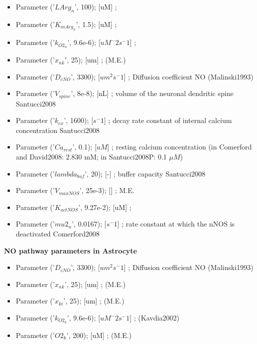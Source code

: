 \documentclass[fleqn]{report}
\numberwithin{equation}{section}
\numberwithin{equation}{section}
\begin{document}
\begin{itemize}
    \item Parameter  ('$LArg_n$', 100);          [uM] ; \\
    \item Parameter  ('$K_{mArg_{n}}$', 1.5);        [uM] ; \\
    \item Parameter  ('$k_{O2_{n}}$', 9.6e-6);       [$uM^-2 s^-1$] ; %
    \item Parameter  ('$x_{nk}'$, 25);             [um] ;  (M.E.)
    \item Parameter  ('$D_{cNO}$', 3300);          [$um^2 s^-1$] ; Diffusion coefficient NO (Malinski1993)
    \item Parameter  ('$V_{spine}$', 8e-8);        [nL] ; volume of the neuronal dendritic spine Santucci2008\\
    \item Parameter  ('$k_{ex}$', 1600);           [$s^-1$] ; decay rate constant of internal calcium concentration Santucci2008\\
    \item Parameter  ('$Ca_{rest}$', 0.1);         [$uM$] ; resting calcium concentration (in Comerford and David2008: 2.830 mM; in Santucci2008P: 0.1 $\mu M$)\\
    \item Parameter  ('$lambda_{buf}$', 20);       [-] ; buffer capacity Santucci2008\\
    \item Parameter  ('$V_{maxNOS}$', 25e-3);      [] ; M.E.\\
    \item Parameter  ('$K_{actNOS}$', 9.27e-2);    [uM] ; \\
    \item Parameter  ('$mu2_n$', 0.0167);        [$s^-1$] ; rate constant at which the nNOS is deactivated Comerford2008\\
\end{itemize}

\textbf{NO pathway parameters in Astrocyte}

\begin{itemize}
    \item  Parameter  ('$D_{cNO}$', 3300);          [$um^2 s^-1$] ; Diffusion coefficient NO (Malinski1993)\\
    \item  Parameter  ('$x_{nk}$', 25);             [um] ;  (M.E.)\\
    \item  Parameter  ('$x_{ki}$', 25);             [um] ;  (M.E.)\\
    \item Parameter  ('$k_{O2_{k}}$', 9.6e-6);       [$uM^-2 s^-1$] ;  (Kavdia2002)\\
    \item  Parameter  ('$O2_k$', 200);            [uM] ;  (M.E.)
\end{itemize}
\end{document}
